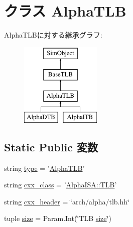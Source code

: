 \hypertarget{classAlphaTLB_1_1AlphaTLB}{
\section{クラス AlphaTLB}
\label{classAlphaTLB_1_1AlphaTLB}
}
AlphaTLBに対する継承グラフ:\begin{figure}[H]
\begin{center}
\leavevmode
\includegraphics[height=4cm]{classAlphaTLB_1_1AlphaTLB}
\end{center}
\end{figure}
\subsection*{Static Public 変数}
\begin{DoxyCompactItemize}
\item 
string \hyperlink{classAlphaTLB_1_1AlphaTLB_acce15679d830831b0bbe8ebc2a60b2ca}{type} = '\hyperlink{classAlphaTLB_1_1AlphaTLB}{AlphaTLB}'
\item 
string \hyperlink{classAlphaTLB_1_1AlphaTLB_a58cd55cd4023648e138237cfc0822ae3}{cxx\_\-class} = '\hyperlink{classAlphaISA_1_1TLB}{AlphaISA::TLB}'
\item 
string \hyperlink{classAlphaTLB_1_1AlphaTLB_a17da7064bc5c518791f0c891eff05fda}{cxx\_\-header} = \char`\"{}arch/alpha/tlb.hh\char`\"{}
\item 
tuple \hyperlink{classAlphaTLB_1_1AlphaTLB_a377e5da8df1f89c5468c8b8cd07eac89}{size} = Param.Int(\char`\"{}TLB \hyperlink{classAlphaTLB_1_1AlphaTLB_a377e5da8df1f89c5468c8b8cd07eac89}{size}\char`\"{})
\end{DoxyCompactItemize}


